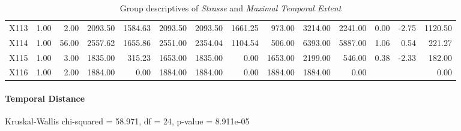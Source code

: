 \begin{table}[ht!]
\begin{tabular}{rrrrrrrrrrrrrr}
    X113 & 1.00 & 2.00 & 2093.50 & 1584.63 & 2093.50 & 2093.50 & 1661.25 & 973.00 & 3214.00 & 2241.00 & 0.00 & -2.75 & 1120.50 \\ 
    X114 & 1.00 & 56.00 & 2557.62 & 1655.86 & 2551.00 & 2354.04 & 1104.54 & 506.00 & 6393.00 & 5887.00 & 1.06 & 0.54 & 221.27 \\ 
    X115 & 1.00 & 3.00 & 1835.00 & 315.23 & 1653.00 & 1835.00 & 0.00 & 1653.00 & 2199.00 & 546.00 & 0.38 & -2.33 & 182.00 \\ 
    X116 & 1.00 & 2.00 & 1884.00 & 0.00 & 1884.00 & 1884.00 & 0.00 & 1884.00 & 1884.00 & 0.00 &  &  & 0.00 \\ 
     \hline
  \end{tabular}
	\caption{Group descriptives of \textit{Strasse} and \textit{Maximal Temporal Extent}}
	\label{tbl:descriptives_baysis_matched_Strasse_TMax}
\end{table}

\paragraph{Temporal Distance}
Kruskal-Wallis chi-squared = 58.971, df = 24, p-value = 8.911e-05

